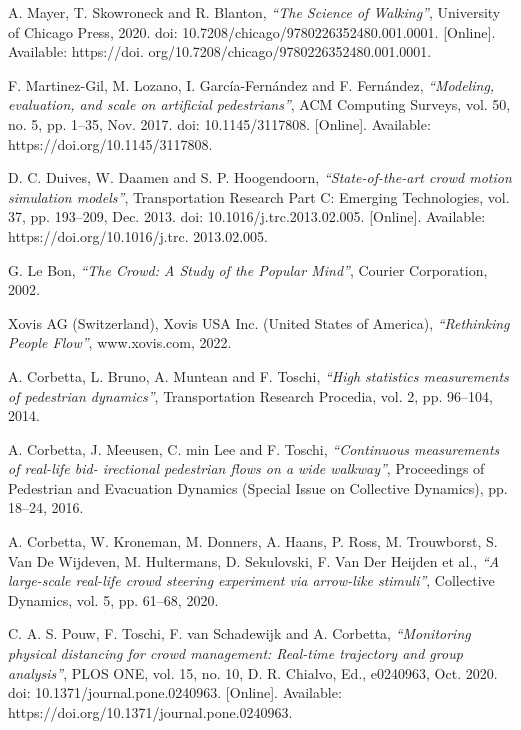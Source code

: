 \documentclass{standalone}
\begin{document}
\begin{thebibliography}{99}



A. Mayer, T. Skowroneck and R. Blanton,
  \textit{“The Science of Walking”},
University of Chicago Press, 
2020. 
doi: 10.7208/chicago/9780226352480.001.0001. 
[Online]. Available: https://doi. org/10.7208/chicago/9780226352480.001.0001.

F. Martinez-Gil, M. Lozano, I. García-Fernández and F. Fernández,
  \textit{“Modeling, evaluation, and scale on artificial pedestrians”},
ACM Computing Surveys,
 vol. 50, no. 5, pp. 1–35, 
 Nov. 2017. 
 doi: 10.1145/3117808. 
 [Online]. Available: https://doi.org/10.1145/3117808.

D. C. Duives, W. Daamen and S. P. Hoogendoorn,
  \textit{“State-of-the-art crowd motion simulation models”},
Transportation Research Part C: Emerging Technologies,
 vol. 37, pp. 193–209, 
 Dec. 2013. 
 doi: 10.1016/j.trc.2013.02.005.
 [Online]. Available: https://doi.org/10.1016/j.trc. 2013.02.005.

G. Le Bon,
  \textit{“The Crowd: A Study of the Popular Mind”},
Courier Corporation, 
2002.

Xovis AG (Switzerland), Xovis USA Inc. (United States of America),
  \textit{“Rethinking People Flow”},
www.xovis.com,
2022.

A. Corbetta, L. Bruno, A. Muntean and F. Toschi,
  \textit{“High statistics measurements of pedestrian dynamics”},
Transportation Research Procedia,
vol. 2, 
pp. 96–104, 
2014.

A. Corbetta, J. Meeusen, C. min Lee and F. Toschi,
  \textit{“Continuous measurements of real-life bid- irectional pedestrian flows on a wide walkway”},
Proceedings of Pedestrian and Evacuation Dynamics (Special Issue on Collective Dynamics), 
pp. 18–24, 
2016.

A. Corbetta, W. Kroneman, M. Donners, A. Haans, P. Ross, M. Trouwborst, S. Van De Wijdeven, M. Hultermans, D. Sekulovski, F. Van Der Heijden et al.,
  \textit{“A large-scale real-life crowd steering experiment via arrow-like stimuli”},
Collective Dynamics, 
vol. 5, pp. 61–68, 
2020.

C. A. S. Pouw, F. Toschi, F. van Schadewijk and A. Corbetta, 
  \textit{“Monitoring physical distancing for crowd management: Real-time trajectory and group analysis”}, 
  PLOS ONE, vol. 15, no. 10, D. R. Chialvo, 
  Ed., e0240963, 
  Oct. 2020. 
  doi: 10.1371/journal.pone.0240963. 
  [Online]. Available: https://doi.org/10.1371/journal.pone.0240963.


\end{thebibliography}
\end{document}
